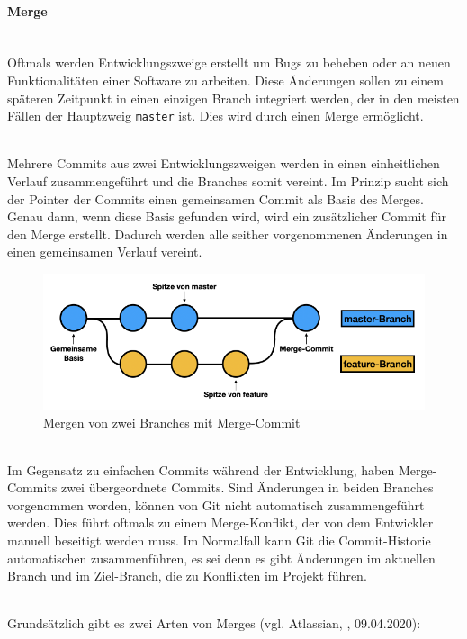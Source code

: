\paragraph{Merge}\mbox{}\\
Oftmals werden Entwicklungszweige erstellt um Bugs zu beheben oder an neuen Funktionalitäten einer Software zu arbeiten. Diese Änderungen sollen zu einem späteren Zeitpunkt in einen einzigen Branch integriert werden, der in den meisten Fällen der Hauptzweig \texttt{master} ist. Dies wird durch einen Merge ermöglicht.

 \mbox{}\\
Mehrere Commits aus zwei Entwicklungszweigen werden in einen einheitlichen Verlauf zusammengeführt und die Branches somit vereint. Im Prinzip sucht sich der Pointer der Commits einen gemeinsamen Commit als Basis des Merges. Genau dann, wenn diese Basis gefunden wird, wird ein zusätzlicher Commit für den Merge erstellt. Dadurch werden alle seither vorgenommenen Änderungen in einen gemeinsamen Verlauf vereint.

\begin{figure}[H]
\begin{center}
	\includegraphics[scale=.8]{images/git-merge.png}
\end{center}
	\caption{Mergen von zwei Branches mit Merge-Commit}
\end{figure}

 \mbox{}\\
Im Gegensatz zu einfachen Commits während der Entwicklung, haben Merge-Commits zwei übergeordnete Commits. Sind Änderungen in beiden Branches vorgenommen worden, können von Git nicht automatisch zusammengeführt werden. Dies führt oftmals zu einem Merge-Konflikt, der von dem Entwickler manuell beseitigt werden muss. Im Normalfall kann Git die Commit-Historie automatischen zusammenführen, es sei denn es gibt Änderungen im aktuellen Branch und im Ziel-Branch, die zu Konflikten im Projekt führen.

 \mbox{}\\
Grundsätzlich gibt es zwei Arten von Merges (vgl. Atlassian, \cite{atlassian_git_merge_2021}, 09.04.2020):


